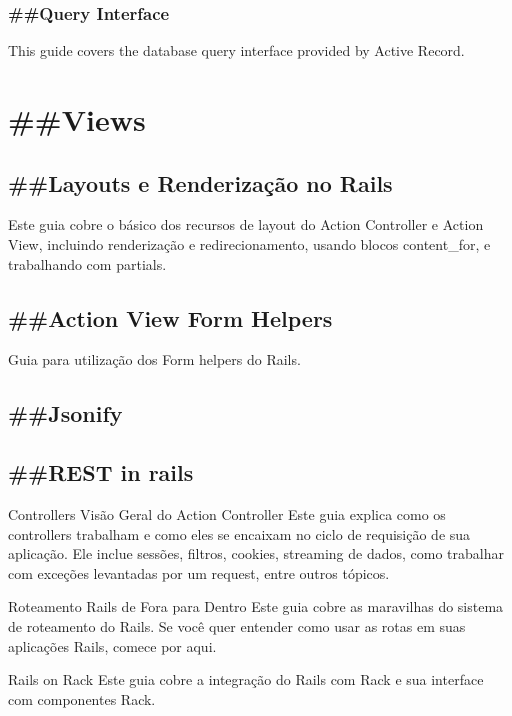 \documentclass[serif,mathserif]{article}
\begin{document}
\subsubsection{\#\#Query Interface}
This guide covers the database query interface provided by Active Record.



\section{\#\#Views}

\subsection{\#\#Layouts e Renderização no Rails}
  Este guia cobre o básico dos recursos de layout do Action Controller e Action View,
  incluindo renderização e redirecionamento, usando blocos content\_for, e trabalhando com partials.

\subsection{\#\#Action View Form Helpers}
  Guia para utilização dos Form helpers do Rails.

\subsection{\#\#Jsonify}

\subsection{\#\#REST in rails}



Controllers
Visão Geral do Action Controller
Este guia explica como os controllers trabalham e como eles se encaixam no ciclo de requisição de sua aplicação. Ele inclue sessões, filtros, cookies, streaming de dados, como trabalhar com exceções levantadas por um request, entre outros tópicos.

Roteamento Rails de Fora para Dentro
Este guia cobre as maravilhas do sistema de roteamento do Rails. Se você quer entender como usar as rotas em suas aplicações Rails, comece por aqui.

Rails on Rack
Este guia cobre a integração do Rails com Rack e sua interface com componentes Rack.
\end{document}
